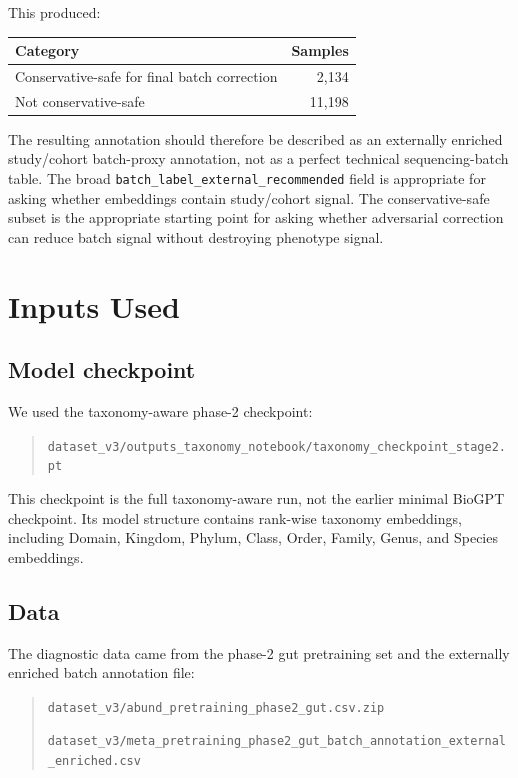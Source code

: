 \documentclass[11pt]{article}
\newcommand{\code}[1]{\texttt{\small #1}}
\begin{document}
This produced:

\begin{center}
\begin{tabular}{lr}
\toprule
Category & Samples \\
\midrule
Conservative-safe for final batch correction & 2,134 \\
Not conservative-safe & 11,198 \\
\bottomrule
\end{tabular}
\end{center}

The resulting annotation should therefore be described as an externally enriched
study/cohort batch-proxy annotation, not as a perfect technical sequencing-batch table.
The broad \code{batch\_label\_external\_recommended} field is appropriate for asking
whether embeddings contain study/cohort signal. The conservative-safe subset is the
appropriate starting point for asking whether adversarial correction can reduce batch
signal without destroying phenotype signal.

\section{Inputs Used}

\subsection{Model checkpoint}

We used the taxonomy-aware phase-2 checkpoint:

\begin{quote}
\code{dataset\_v3/outputs\_taxonomy\_notebook/taxonomy\_checkpoint\_stage2.pt}
\end{quote}

This checkpoint is the full taxonomy-aware run, not the earlier minimal BioGPT
checkpoint. Its model structure contains rank-wise taxonomy embeddings, including
Domain, Kingdom, Phylum, Class, Order, Family, Genus, and Species embeddings.

\subsection{Data}

The diagnostic data came from the phase-2 gut pretraining set and the externally enriched
batch annotation file:

\begin{quote}
\code{dataset\_v3/abund\_pretraining\_phase2\_gut.csv.zip}

\code{dataset\_v3/meta\_pretraining\_phase2\_gut\_batch\_annotation\_external\_enriched.csv}
\end{quote}
\end{document}
